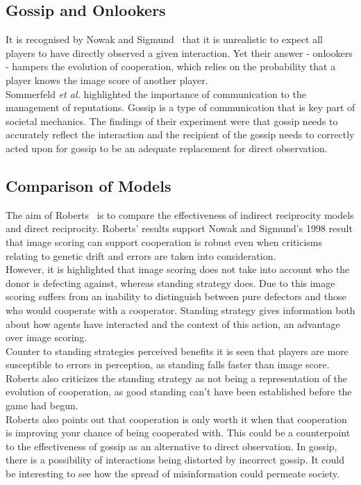 \documentclass[twoside,twocolumn]{article}
\begin{document}
\subsection{Gossip and Onlookers}
It is recognised by Nowak and Sigmund~\cite{evol_indirect_image} that it is unrealistic to expect all players to have directly observed a given interaction. Yet their answer - onlookers - hampers the evolution of cooperation, which relies on the probability that a player knows the image score of another player.\\
Sommerfeld \textit{et al.} highlighted the importance of communication to the management of reputations. Gossip is a type of communication that is key part of societal mechanics. The findings of their experiment were that gossip needs to accurately reflect the interaction and the recipient of the gossip needs to correctly acted upon for gossip to be an adequate replacement for direct observation.

\subsection{Comparison of Models}
The aim of Roberts~\cite{evoldirindir} is to compare the effectiveness of indirect reciprocity models and direct reciprocity. Roberts' results support Nowak and Sigmund's 1998 result that image scoring can support cooperation is robust even when criticisms relating to genetic drift and errors are taken into consideration.\\
However, it is highlighted that image scoring does not take into account who the donor is defecting against, whereas standing strategy does. Due to this image scoring suffers from an inability to distinguish between pure defectors and those who would cooperate with a cooperator. Standing strategy gives information both about how agents have interacted and the context of this action, an advantage over image scoring.\\
Counter to standing strategies perceived benefits it is seen that players are more susceptible to errors in perception, as standing falls faster than image score. Roberts also criticizes the standing strategy as not being a representation of the evolution of cooperation, as good standing can't have been established before the game had begun.\\
Roberts also points out that cooperation is only worth it when that cooperation is improving your chance of being cooperated with. This could be a counterpoint to the effectiveness of gossip as an alternative to direct observation. In gossip, there is a possibility of interactions being distorted by incorrect gossip. It could be interesting to see how the spread of misinformation could permeate society.
\end{document}
